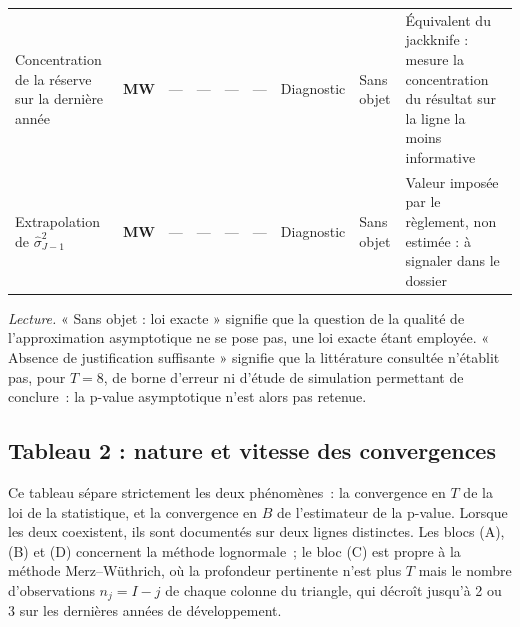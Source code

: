 \documentclass[a4paper,11pt]{article}
\begin{document}
\begin{landscape}
\begin{center}
\begin{longtable}{@{}p{2.9cm}p{1.5cm}p{1.1cm}p{1.3cm}p{1.3cm}p{1.3cm}p{2.7cm}p{4.7cm}p{4.1cm}@{}}
Concentration de la réserve sur la dernière année & \textbf{MW} & --- & --- & --- &
--- & Diagnostic & Sans objet & Équivalent du jackknife : mesure la concentration
du résultat sur la ligne la moins informative \\

Extrapolation de $\hat\sigma^2_{J-1}$ & \textbf{MW} & --- & --- & --- & --- &
Diagnostic & Sans objet & Valeur imposée par le règlement, non estimée :
à signaler dans le dossier \\
\end{longtable}
\end{center}
\end{landscape}

\noindent\emph{Lecture.} « Sans objet : loi exacte » signifie que la question de
la qualité de l'approximation asymptotique ne se pose pas, une loi exacte étant
employée. « Absence de justification suffisante » signifie que la littérature
consultée n'établit pas, pour $T = 8$, de borne d'erreur ni d'étude de
simulation permettant de conclure~: la p-value asymptotique n'est alors pas
retenue.

\newpage
\subsection{Tableau 2 : nature et vitesse des convergences}
\label{tab:conv}

Ce tableau sépare strictement les deux phénomènes~: la convergence en $T$ de la
loi de la statistique, et la convergence en $B$ de l'estimateur de la p-value.
Lorsque les deux coexistent, ils sont documentés sur deux lignes distinctes. Les
blocs (A), (B) et (D) concernent la méthode lognormale~; le bloc (C) est propre à
la méthode Merz--Wüthrich, où la profondeur pertinente n'est plus $T$ mais le
nombre d'observations $n_j = I - j$ de chaque colonne du triangle, qui décroît
jusqu'à 2 ou 3 sur les dernières années de développement.
\end{document}
